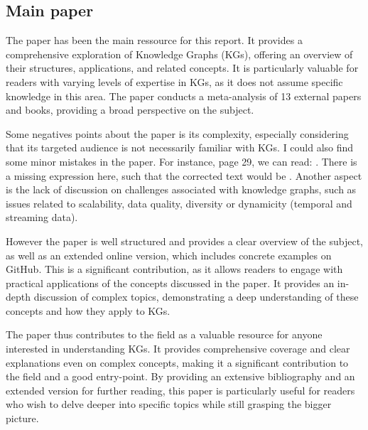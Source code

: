 \documentclass[11pt]{article} %
\begin{document}
\subsection{Main paper}
The paper  has been the main ressource for this report. It provides a comprehensive exploration of Knowledge Graphs (KGs), offering an overview of their structures, applications, and related concepts. It is particularly valuable for readers with varying levels of expertise in KGs, as it does not assume specific knowledge in this area. The paper conducts a meta-analysis of 13 external papers and books, providing a broad perspective on the subject. 

Some negatives points about the paper is its complexity, especially considering that its targeted audience is not necessarily familiar with KGs. I could also find some minor mistakes in the paper. For instance, page 29, we can read:  \cite[p29]{KG21}. There is a missing expression here, such that the corrected text would be . Another aspect is the lack of discussion on challenges associated with knowledge graphs, such as issues related to scalability, data quality, diversity or dynamicity (temporal and streaming data).

However the paper is well structured and provides a clear overview of the subject, as well as an extended online version, which includes concrete examples on GitHub. This is a significant contribution, as it allows readers to engage with practical applications of the concepts discussed in the paper. It provides an in-depth discussion of complex topics, demonstrating a deep understanding of these concepts and how they apply to KGs. 

The paper thus contributes to the field as a valuable resource for anyone interested in understanding KGs. It provides comprehensive coverage and clear explanations even on complex concepts, making it a significant contribution to the field and a good entry-point. By providing an extensive bibliography and an extended version for further reading, this paper is particularly useful for readers who wish to delve deeper into specific topics while still grasping the bigger picture.
\end{document}
